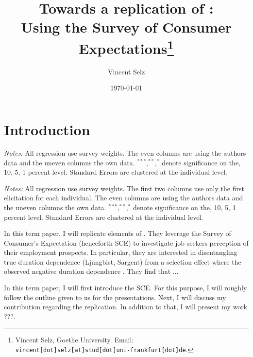 \documentclass[11pt,a4paper,leqno]{article}
\title{Towards a replication of \textcite{MST2021}:  \\ Using the Survey of Consumer Expectations\thanks{Vincent Selz, Goethe University. Email: \texttt{vincent[dot]selz[at]stud[dot]uni-frankfurt[dot]de}. } }
\author{Vincent Selz}
\date{
	\today
}
\begin{document}
\maketitle


\clearpage
\section{Introduction}




\begin{center}
	\tiny

\textit{Notes:} All regression use survey weights. The even columns are using the authors data and the uneven columns the own data. $^{{***}}$,$^{{**}}$,$^{{*}}$ denote significance on the, 10, 5, 1 percent level. Standard Errors are clustered at the individual level.
\end{center}


\begin{center}
	\tiny
	
	\textit{Notes:} All regression use survey weights. The first two columns use only the first elicitation for each individual. The even columns are using the authors data and the uneven columns the own data. $^{{***}}$,$^{{**}}$,$^{{*}}$ denote significance on the, 10, 5, 1 percent level. Standard Errors are clustered at the individual level.
\end{center}

\begin{center}
	
\end{center}


In this term paper, I will replicate elements of \textcite{MST2021}. They leverage the Survey of Consumer's Expectation (henceforth SCE) to investigate job seekers perception of their employment prospects. In particular, they are interested in disentangling true duration dependence (Ljungbist, Sargent) from a selection effect where the observed negative duration dependence . They find that ... 

In this term paper, I will first introduce the SCE. For this purpose, I will roughly follow the outline given to us for the presentations. Next, I will discuss my contribution regarding the replication. In addition to that, I will present my work ???. 
\end{document}
